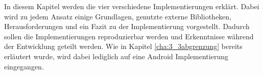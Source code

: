 In diesem Kapitel werden die vier verschiedene Implementierungen erklärt. Dabei wird zu jedem Ansatz einige Grundlagen, genutzte externe Bibliotheken, Herausforderungen und ein Fazit zu der Implementierung vorgestellt. Dadurch sollen die Implementierungen reproduzierbar werden und Erkenntnisse während der Entwicklung geteilt werden. Wie in Kapitel \ref{cha:3_3abgrenzung} bereits erläutert wurde, wird dabei lediglich auf eine Android Implementierung eingegangen. 







